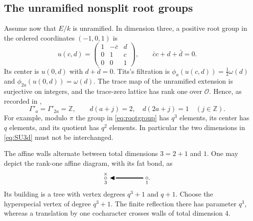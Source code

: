 \documentclass[11pt,a4paper]{article}
\theoremstyle{definition}
\newcommand{\Z}{\mathbb Z}
\newcommand{\OO}{\mathcal O}
\begin{document}
\subsection{The unramified nonsplit root groups}
Assume now that $E/k$ is unramified. In dimension three, a positive
root group in the ordered coordinates $(-1,0,1)$ is
\begin{equation}\label{eq:rootgroup}
 u(c,d)=\begin{pmatrix}1&-\bar c&d\\0&1&c\\0&0&1\end{pmatrix},
 \qquad \bar c c+d+\bar d=0.
\end{equation}
Its center is $u(0,d)$ with $d+\bar d=0$. Tits's filtration is
$\phi_a(u(c,d))=\frac12\omega(d)$ and
$\phi_{2a}(u(0,d))=\omega(d)$. The trace map of the unramified
extension is surjective on integers, and the trace-zero lattice has
rank one over $\OO$. Hence, as recorded in
\cite[Example~1.15, pp.~40--42]{Tits},
\begin{equation}\label{eq:SU3d}
 \Gamma'_a=\Gamma'_{2a}=\Z,\qquad
 d(a+j)=2,\quad d(2a+j)=1\quad(j\in\Z).
\end{equation}
For example, modulo $\pi$ the group in \eqref{eq:rootgroup} has
$q^3$ elements, its center has $q$ elements, and its quotient has
$q^2$ elements. In particular the two dimensions in
\eqref{eq:SU3d} must not be interchanged.

The affine walls alternate between total dimensions $3=2+1$ and $1$.
One may depict the rank-one affine diagram, with its fat bond, as
\[
 \underset{3}{\overset{\times}{\circ}}
 \mathrel{\blacktriangleleft\!\rule[0.45ex]{1.4cm}{1.2pt}}
 \underset{1}{\circ}.
\]
Its building is a tree with vertex degrees $q^3+1$ and $q+1$.
Choose the hyperspecial vertex of degree $q^3+1$.
The finite reflection there has parameter $q^3$, whereas a translation
by one cocharacter crosses walls of total dimension $4$.
\end{document}

